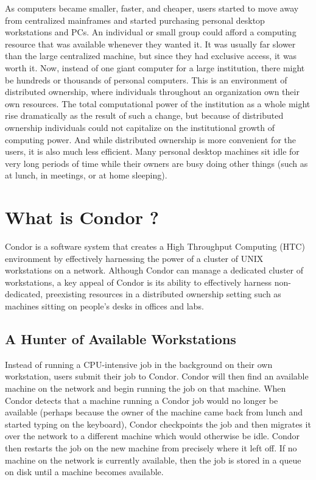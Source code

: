 As computers became smaller, faster, and cheaper, users started to move
away from centralized mainframes and started purchasing personal desktop
workstations and PCs. An individual or small group could afford a
computing resource that was available whenever they wanted it. It was
usually far slower than the large centralized machine, but since they
had exclusive access, it was worth it. Now, instead of one giant
computer for a large institution, there might be hundreds or thousands
of personal computers. This is an environment of distributed ownership,
where individuals throughout an organization own their own resources.
The total computational power of the institution as a whole might rise
dramatically as the result of such a change, but because of distributed
ownership individuals could not capitalize on the institutional growth of
computing power. And while distributed ownership is more convenient for
the users, it is also much less efficient. Many personal desktop
machines sit idle for very long periods of time while their owners are
busy doing other things (such as at lunch, in meetings, or at home
sleeping). 

\section{What is Condor ?}
\label{sec:what-is-condor}

Condor is a software system that creates a High Throughput Computing
(HTC) environment by effectively harnessing the power of a cluster of
UNIX workstations on a network. Although Condor can manage a dedicated
cluster of workstations, a key appeal of Condor is its ability to
effectively harness non-dedicated, preexisting resources in a
distributed ownership setting such as machines sitting on people's desks
in offices and labs. 

\subsection{A Hunter of Available Workstations}

Instead of running a CPU-intensive job in the background on their own
workstation, users submit their job to Condor. Condor will then find an
available machine on the network and begin running the job on
that machine. When Condor detects that a machine running a Condor job
would no longer be available (perhaps because the owner of the machine
came back from lunch and started typing on the keyboard), Condor
checkpoints the job and then migrates it over the network to a
different machine which would otherwise be idle. Condor then restarts
the job on the new machine from precisely where it left off. If no
machine on the network is currently available, then the job is stored in
a queue on disk until a machine becomes available.

